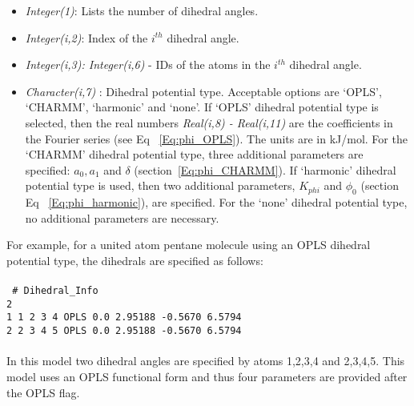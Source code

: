 {{{\begin{itemize}
%
\item {\it Integer(1)}: Lists the number of dihedral angles. 
%
\item {\it Integer(i,2)}: Index of the $i^{th}$ dihedral angle. 
%
\item {\it Integer(i,3): Integer(i,6)} - IDs of the atoms in the $i^{th}$
dihedral angle. 
%
\item {\it Character(i,7) }: Dihedral potential type. Acceptable options
are `OPLS', `CHARMM', `harmonic' and `none'. If `OPLS' dihedral
potential type is selected, then the real numbers {\it Real(i,8) -
  Real(i,11)} are the coefficients in the Fourier series
(see Eq ~\ref{Eq:phi_OPLS}). The units are in kJ/mol. For the `CHARMM'
dihedral potential type, three additional parameters are specified:
$a_0, a_1$ and $\delta$ (section~\ref{Eq:phi_CHARMM}).  If `harmonic' dihedral
potential type is used, then two additional parameters, $K_{phi}$ and
$\phi_0$ (section Eq ~\ref{Eq:phi_harmonic}), are specified.  For the `none' dihedral potential
type, no additional parameters are necessary.

\end{itemize}
%
For example, for a united atom pentane molecule using an OPLS dihedral potential type, 
the dihedrals are specified as follows:\\ \\
%
\texttt{
\# Dihedral\_Info\\
2\\
1    1    2    3    4    OPLS     0.0     2.95188     -0.5670     6.5794\\
2    2    3    4    5    OPLS     0.0     2.95188     -0.5670     6.5794\\
}\\
%
In this model two dihedral angles are specified by atoms 1,2,3,4 and 2,3,4,5. 
This model uses an OPLS functional form and thus four parameters are provided
after the OPLS flag.
%
}}}
